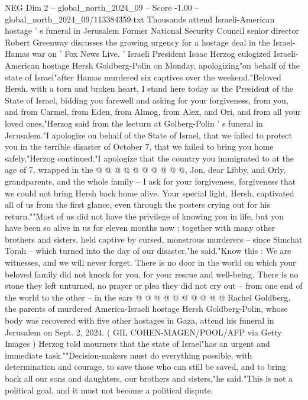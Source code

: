 \begin{textsample}{NEG Dim 2 – global\_north\_2024\_09 – Score -1.00 – global\_north\_2024\_09/113384359.txt}  \label{ex:f2_neg_033}
Thousands attend Israeli-American hostage ' s funeral in Jerusalem Former National Security Council senior director Robert Greenway discusses the growing urgency for a hostage deal in the Israel-Hamas war on ' Fox News Live. ' Israeli President Isaac Herzog eulogized Israeli-American hostage Hersh Goldberg-Polin on Monday, apologizing"on behalf of the state of Israel"after Hamas murdered six captives over the weekend."Beloved Hersh, with a torn and broken heart, I stand here today as the President of the State of Israel, bidding you farewell and asking for your forgiveness, from you, and from Carmel, from Eden, from Almog, from Alex, and Ori, and from all your loved ones,"Herzog said from the lecturn at Golberg-Polin ' s funeral in Jerusalem."I apologize on behalf of the State of Israel, that we failed to protect you in the terrible disaster of October 7, that we failed to bring you home safely,"Herzog continued."I apologize that the country you immigrated to at the age of 7, wrapped in the @ @ @ @ @ @ @ @ @ @, Jon, dear Libby, and Orly, grandparents, and the whole family -- I ask for your forgiveness, forgiveness that we could not bring Hersh back home alive.
Your special light, Hersh, captivated all of us from the first glance, even through the posters crying out for his return.""Most of us did not have the privilege of knowing you in life, but you have been so alive in us for eleven months now ; together with many other brothers and sisters, held captive by cursed, monstrous murderers -- since Simchat Torah -- which turned into the day of our disaster,"he said."Know this : We are witnesses, and we will never forget.
There is no door in the world on which your beloved family did not knock for you, for your rescue and well-being.
There is no stone they left unturned, no prayer or plea they did not cry out -- from one end of the world to the other -- in the ears @ @ @ @ @ @ @ @ @ @ Rachel Goldberg, the parents of murdered America-Israeli hostage Hersh Goldberg-Polin, whose body was recovered with five other hostages in Gaza, attend his funeral in Jerusalem on Sept. 2, 2024. ( GIL COHEN-MAGEN/POOL/AFP via Getty Images ) Herzog told mourners that the state of Israel"has an urgent and immediate task.""Decision-makers must do everything possible, with determination and courage, to save those who can still be saved, and to bring back all our sons and daughters, our brothers and sisters,"he said."This is not a political goal, and it must not become a political dispute.

\end{textsample}
